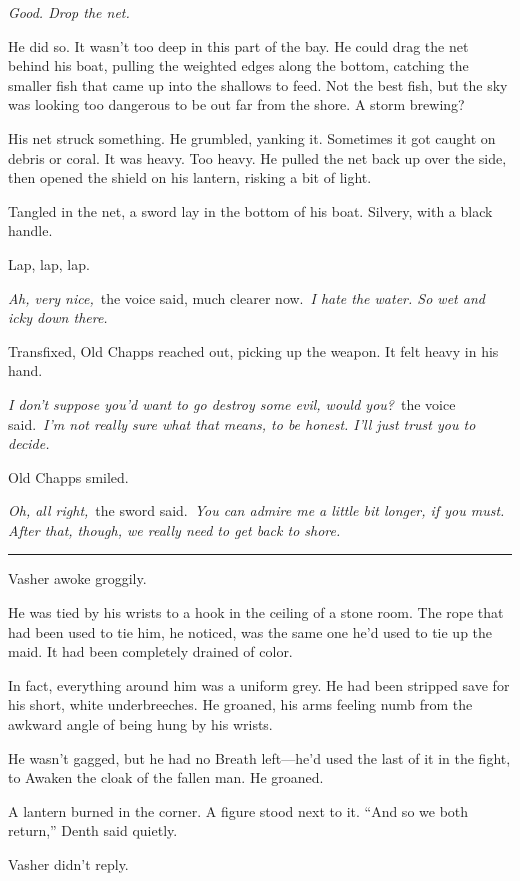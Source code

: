\textit{Good. Drop the net.}

He did so. It wasn’t too deep in this part of the bay. He could drag the net behind his boat, pulling the weighted edges along the bottom, catching the smaller fish that came up into the shallows to feed. Not the best fish, but the sky was looking too dangerous to be out far from the shore. A storm brewing?

His net struck something. He grumbled, yanking it. Sometimes it got caught on debris or coral. It was heavy. Too heavy. He pulled the net back up over the side, then opened the shield on his lantern, risking a bit of light.

Tangled in the net, a sword lay in the bottom of his boat. Silvery, with a black handle.

Lap, lap, lap.

\textit{Ah, very nice,}~the voice said, much clearer now.~\textit{I hate the water. So wet and icky down there.}

Transfixed, Old Chapps reached out, picking up the weapon. It felt heavy in his hand.

\textit{I don’t suppose you’d want to go destroy some evil, would you?}~the voice said.~\textit{I’m not really sure what that means, to be honest. I’ll just trust you to decide.}

Old Chapps smiled.

\textit{Oh, all right,}~the sword said.~\textit{You can admire me a little bit longer, if you must. After that, though, we really need to get back to shore.}

\bigskip \hrule \bigskip

Vasher awoke groggily.

He was tied by his wrists to a hook in the ceiling of a stone room. The rope that had been used to tie him, he noticed, was the same one he’d used to tie up the maid. It had been completely drained of color.

In fact, everything around him was a uniform grey. He had been stripped save for his short, white underbreeches. He groaned, his arms feeling numb from the awkward angle of being hung by his wrists.

He wasn’t gagged, but he had no Breath left—he’d used the last of it in the fight, to Awaken the cloak of the fallen man. He groaned.

A lantern burned in the corner. A figure stood next to it. “And so we both return,” Denth said quietly.

Vasher didn’t reply.

